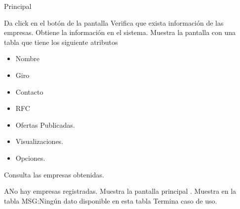 	\begin{UCtrayectoria}{Principal}
	
	\UCpaso [\UCactor] Da click en el botón  de la pantalla 
	\UCpaso Verifica que exista información de las empresas.
	\UCpaso Obtiene la información en el sistema.
	\UCpaso Muestra la pantalla con una tabla que tiene los siguiente atributos
	\begin{itemize}
		\item Nombre
		\item Giro
		\item Contacto
		\item RFC
		\item Ofertas Publicadas.
		\item Visualizaciones.
		\item Opciones.
	\end{itemize}
	\UCpaso[\UCactor] Consulta las empresas obtenidas. 
	
	\end{UCtrayectoria}
	
\begin{UCtrayectoriaA}{A}{No hay empresas registradas.}
	\UCpaso Muestra la pantalla principal . 
	\UCpaso Muestra en la tabla MSG:Ningún dato disponible en esta tabla  
	\UCpaso Termina caso de uso.
\end{UCtrayectoriaA}
	


